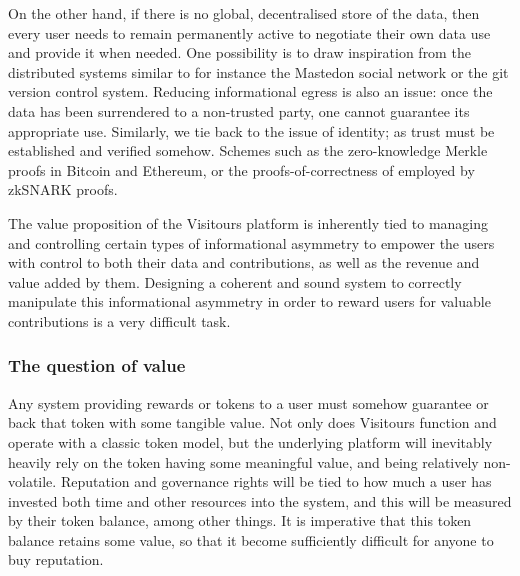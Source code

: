 \documentclass[fontsize=12pt,a4paper]{article}
\begin{document}
On the other hand, if there is no global, decentralised store of the data, then every user needs to remain permanently active to negotiate their own data use and provide it when needed. One possibility is to draw inspiration from the distributed systems similar to for instance the Mastedon social network or the git version control system. Reducing informational egress is also an issue: once the data has been surrendered to a non-trusted party, one cannot guarantee its appropriate use. Similarly, we tie back to the issue of identity; as trust must be established and verified somehow. Schemes such as the zero-knowledge Merkle proofs in Bitcoin and Ethereum, or the proofs-of-correctness of employed by zkSNARK proofs.

The value proposition of the Visitours platform is inherently tied to managing and controlling certain types of informational asymmetry to empower the users with control to both their data and contributions, as well as the revenue and value added by them. Designing a coherent and sound system to correctly manipulate this informational asymmetry in order to reward users for valuable contributions is a very difficult task.

\subsubsection*{The question of value}

Any system providing rewards or tokens to a user must somehow guarantee or back that token with some tangible value. Not only does Visitours function and operate with a classic token model, but the underlying platform will inevitably heavily rely on the token having some meaningful value, and being relatively non-volatile. Reputation and governance rights will be tied to how much a user has invested both time and other resources into the system, and this will be measured by their token balance, among other things. It is imperative that this token balance retains some value, so that it become sufficiently difficult for anyone to buy reputation.
\end{document}
